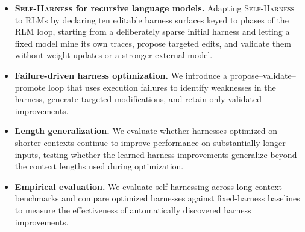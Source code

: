 \documentclass[letterpaper]{article} %
\newcommand{\JB}[1]{\textcolor{teal}{Jaloliddin: #1}}
\newcommand{\rlm}{\textsc{RLM}\xspace}
\newcommand{\rlms}{\textsc{RLM}s\xspace}
\newcommand{\sh}{\textsc{Self-Harness}\xspace}
\begin{document}
\begin{itemize}
    \item \textbf{\sh{} for recursive language models.}
    Adapting \sh{} \citep{zhang2026selfharness} to \rlms by declaring ten editable harness surfaces keyed to phases of the \rlm{} loop, starting from a deliberately sparse initial harness and letting a fixed model mine its own traces, propose targeted edits, and validate them without weight updates or a stronger external model.

    \item \textbf{Failure-driven harness optimization.}
    We introduce a propose--validate--promote loop that uses execution failures to identify weaknesses in the harness, generate targeted modifications, and retain only validated improvements.

    \item \textbf{Length generalization.}
    We evaluate whether harnesses optimized on shorter contexts continue to improve performance on substantially longer inputs, testing whether the learned harness improvements generalize beyond the context lengths used during optimization.

    \item \textbf{Empirical evaluation.}
    We evaluate self-harnessing across long-context benchmarks and compare optimized harnesses against fixed-harness baselines to measure the effectiveness of automatically discovered harness improvements.
\end{itemize}


\end{document}
